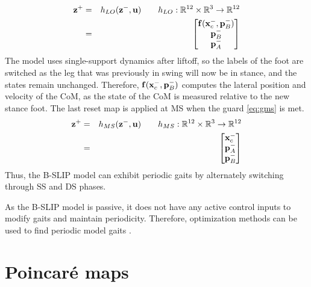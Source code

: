 \begin{eqnarray}
	\mathbf{z}^+ &=& h_{LO}(\mathbf{z}^-,\mathbf{u}) \qquad h_{LO}:\mathbb{R}^{12} \times \mathbb{R}^{3} \rightarrow \mathbb{R}^{12} \\
	{}	&=& \begin{bmatrix}
		\mathbf{f}(\mathbf{x}_{c}^-,\mathbf{p}_{B}^-) \\
		\mathbf{p}_{B}^- \\
		\mathbf{p}_{A}^-
	\end{bmatrix} \nonumber
\end{eqnarray}
The model uses single-support dynamics after liftoff, so the labels of the foot are switched as the leg that was previously in swing will now be in stance, and the states remain unchanged. Therefore, $ \mathbf{f}(\mathbf{x}_{c}^-,\mathbf{p}_{B}^-) $ computes the lateral position and velocity of the CoM, as the state of the CoM is measured relative to the new stance foot. The last reset map is applied at MS when the guard \eqref{eq:gms} is met.
%
\begin{eqnarray}
	\mathbf{z}^+ &=& h_{MS}(\mathbf{z}^-,\mathbf{u}) \qquad h_{MS}:\mathbb{R}^{12}\times  \mathbb{R}^{3} \rightarrow \mathbb{R}^{12} \\
	{}	&=& \begin{bmatrix}
		\mathbf{x}_{c}^- \\
		\mathbf{p}_{A}^- \\
		\mathbf{p}_{B}^-
	\end{bmatrix} \nonumber
\end{eqnarray}
%
%
Thus, the B-SLIP model can exhibit periodic gaits by alternately switching through SS and DS phases.

As the B-SLIP model is passive, it does not have any active control inputs to modify gaits and maintain periodicity. Therefore, optimization methods can be used to find periodic model gaits \cite{strogatz2018nonlinear,garcia1998simplest}.

\section{Poincar\'e maps}

